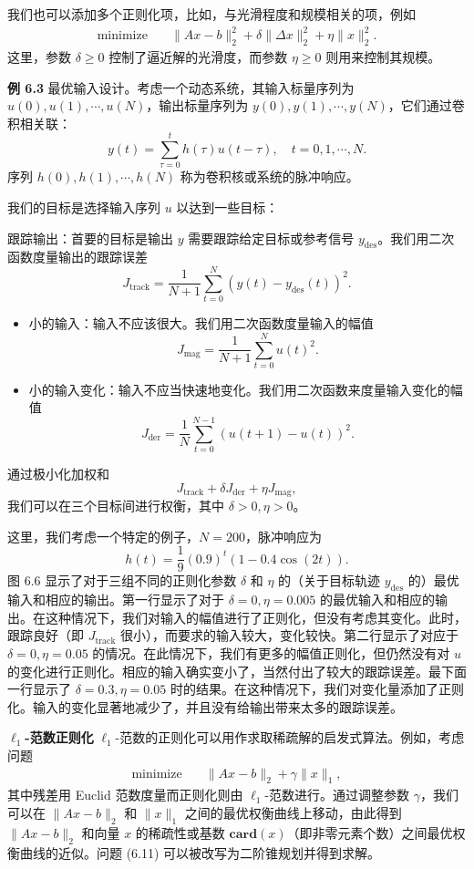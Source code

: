 \documentclass[UTF8,12pt,a4paper,fontset=fandol]{ctexart}
\begin{document}
我们也可以添加多个正则化项，比如，与光滑程度和规模相关的项，例如
\[
\begin{aligned}
\text{minimize}\quad & \|Ax-b\|_2^2+\delta\|\Delta x\|_2^2+\eta\|x\|_2^2.
\end{aligned}
\]
这里，参数 $\delta\geq 0$ 控制了逼近解的光滑度，而参数 $\eta\geq 0$ 则用来控制其规模。

\noindent\textbf{例 6.3}\quad
最优输入设计。考虑一个动态系统，其输入标量序列为 $u(0),u(1),\cdots,u(N)$，输出标量序列为 $y(0),y(1),\cdots,y(N)$，它们通过卷积相关联：
\[
y(t)=\sum_{\tau=0}^t h(\tau)u(t-\tau),\quad t=0,1,\cdots,N.
\]
序列 $h(0),h(1),\cdots,h(N)$ 称为卷积核或系统的脉冲响应。

我们的目标是选择输入序列 $u$ 以达到一些目标：

跟踪输出：首要的目标是输出 $y$ 需要跟踪给定目标或参考信号 $y_{\mathrm{des}}$。我们用二次函数度量输出的跟踪误差
\[
J_{\mathrm{track}}=\frac{1}{N+1}\sum_{t=0}^N (y(t)-y_{\mathrm{des}}(t))^2.
\]

\begin{itemize}
\item 小的输入：输入不应该很大。我们用二次函数度量输入的幅值
\[
J_{\mathrm{mag}}=\frac{1}{N+1}\sum_{t=0}^N u(t)^2.
\]
\item 小的输入变化：输入不应当快速地变化。我们用二次函数来度量输入变化的幅值
\[
J_{\mathrm{der}}=\frac{1}{N}\sum_{t=0}^{N-1}(u(t+1)-u(t))^2.
\]
\end{itemize}

通过极小化加权和
\[
J_{\mathrm{track}}+\delta J_{\mathrm{der}}+\eta J_{\mathrm{mag}},
\]
我们可以在三个目标间进行权衡，其中 $\delta>0,\eta>0$。

这里，我们考虑一个特定的例子，$N=200$，脉冲响应为
\[
h(t)=\frac{1}{9}(0.9)^t(1-0.4\cos(2t)).
\]
图 6.6 显示了对于三组不同的正则化参数 $\delta$ 和 $\eta$ 的（关于目标轨迹 $y_{\mathrm{des}}$ 的）最优输入和相应的输出。第一行显示了对于 $\delta=0,\eta=0.005$ 的最优输入和相应的输出。在这种情况下，我们对输入的幅值进行了正则化，但没有考虑其变化。此时，跟踪良好（即 $J_{\mathrm{track}}$ 很小），而要求的输入较大，变化较快。第二行显示了对应于 $\delta=0,\eta=0.05$ 的情况。在此情况下，我们有更多的幅值正则化，但仍然没有对 $u$ 的变化进行正则化。相应的输入确实变小了，当然付出了较大的跟踪误差。最下面一行显示了 $\delta=0.3,\eta=0.05$ 时的结果。在这种情况下，我们对变化量添加了正则化。输入的变化显著地减少了，并且没有给输出带来太多的跟踪误差。

\noindent\textbf{$\ell_1$-范数正则化}\quad
$\ell_1$-范数的正则化可以用作求取稀疏解的启发式算法。例如，考虑问题
\begin{equation}
\begin{aligned}
\text{minimize}\quad & \|Ax-b\|_2+\gamma\|x\|_1,
\end{aligned}
\tag{6.11}
\end{equation}
其中残差用 Euclid 范数度量而正则化则由 $\ell_1$-范数进行。通过调整参数 $\gamma$，我们可以在 $\|Ax-b\|_2$ 和 $\|x\|_1$ 之间的最优权衡曲线上移动，由此得到 $\|Ax-b\|_2$ 和向量 $x$ 的稀疏性或基数 $\mathbf{card}(x)$（即非零元素个数）之间最优权衡曲线的近似。问题 (6.11) 可以被改写为二阶锥规划并得到求解。
\end{document}
